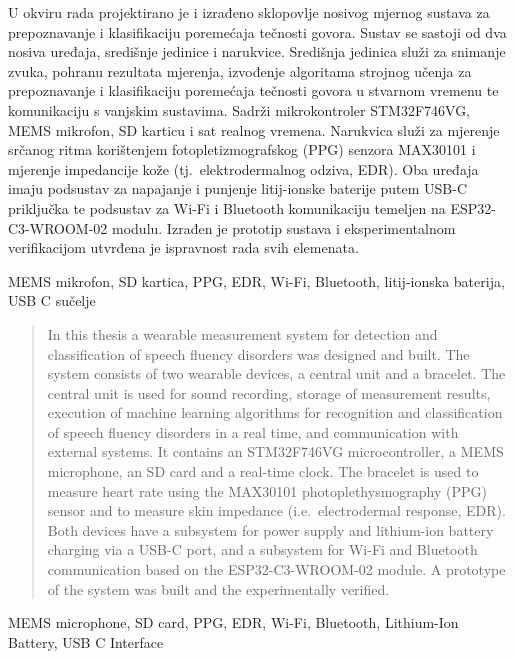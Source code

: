 \documentclass[diplomskirad]{fer}
\begin{document}
\begin{sazetak}
U okviru rada projektirano je i izrađeno sklopovlje nosivog mjernog sustava za prepoznavanje i klasifikaciju poremećaja tečnosti govora. Sustav se sastoji od dva nosiva uređaja, središnje jedinice i narukvice. Središnja jedinica služi za snimanje zvuka, pohranu rezultata mjerenja, izvođenje algoritama strojnog učenja za prepoznavanje i klasifikaciju poremećaja tečnosti govora u stvarnom vremenu te komunikaciju s vanjskim sustavima. Sadrži mikrokontroler STM32F746VG, MEMS mikrofon, SD karticu i sat realnog vremena. Narukvica služi za mjerenje srčanog ritma korištenjem fotopletizmografskog (PPG) senzora MAX30101 i mjerenje impedancije kože (tj.~elektrodermalnog odziva, EDR). Oba uređaja imaju podsustav za napajanje i punjenje litij-ionske baterije putem USB-C priključka te podsustav za Wi-Fi i Bluetooth komunikaciju temeljen na ESP32-C3-WROOM-02 modulu. Izrađen je prototip sustava i eksperimentalnom verifikacijom utvrđena je ispravnost rada svih elemenata.
\end{sazetak}

\begin{kljucnerijeci}
MEMS mikrofon, SD kartica, PPG, EDR, Wi-Fi, Bluetooth, litij-ionska baterija, USB C sučelje
\end{kljucnerijeci}


\begin{abstract}
In this thesis a wearable measurement system for detection and classification of speech fluency disorders was designed and built. The system consists of two wearable devices, a central unit and a bracelet. The central unit is used for sound recording, storage of measurement results, execution of machine learning algorithms for recognition and classification of speech fluency disorders in a real time, and communication with external systems. It contains an STM32F746VG microcontroller, a MEMS microphone, an SD card and a real-time clock. The bracelet is used to measure heart rate using the MAX30101 photoplethysmography (PPG) sensor and to measure skin impedance (i.e.~electrodermal response, EDR). Both devices have a subsystem for power supply and lithium-ion battery charging via a USB-C port, and a subsystem for Wi-Fi and Bluetooth communication based on the ESP32-C3-WROOM-02 module. A prototype of the system was built and the experimentally verified.
\end{abstract}

\begin{keywords}
  MEMS microphone, SD card, PPG, EDR, Wi-Fi, Bluetooth, Lithium-Ion Battery, USB C Interface
\end{keywords}



\backmatter
\end{document}
